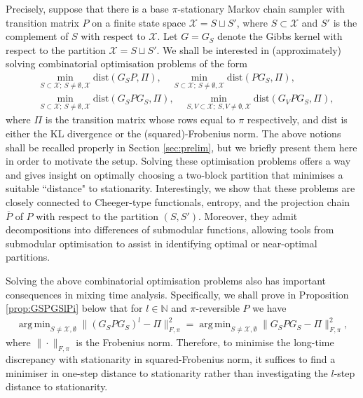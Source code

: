 \documentclass[EJP]{ejpecp} %
\DeclareMathOperator*{\argmin}{arg\,min}
\begin{document}
Precisely, suppose that there is a base $\pi$-stationary Markov chain sampler with transition matrix $P$ on a finite state space $\mathcal{X} = S \sqcup S'$, where $S \subset \mathcal{X}$ and $S'$ is the complement of $S$ with respect to $\mathcal{X}$. Let $G = G_S$ denote the Gibbs kernel with respect to the partition $\mathcal{X} = S \sqcup S'$. We shall be interested in (approximately) solving combinatorial optimisation problems of the form
\begin{align*}
    &\min_{S \subset \mathcal{X};~ S \neq \emptyset, \mathcal{X}} \mathrm{dist}(G_SP, \Pi), \quad \min_{S \subset \mathcal{X};~ S \neq \emptyset, \mathcal{X}} \mathrm{dist}(P G_S, \Pi), \\
    &\min_{S \subset \mathcal{X};~ S \neq \emptyset, \mathcal{X}} \mathrm{dist}(G_SPG_S, \Pi), \quad \min_{S,V \subset \mathcal{X};~ S,V \neq \emptyset, \mathcal{X}} \mathrm{dist}(G_VPG_S, \Pi),
\end{align*}
where $\Pi$ is the transition matrix whose rows equal to $\pi$ respectively, and $\mathrm{dist}$ is either the KL divergence or the (squared)-Frobenius norm. The above notions shall be recalled properly in Section \ref{sec:prelim}, but we briefly present them here in order to motivate the setup. Solving these optimisation problems offers a way and gives insight on optimally choosing a two-block partition that minimises a suitable ``distance" to stationarity. Interestingly, we show that these problems are closely connected to Cheeger-type functionals, entropy, and the projection chain $\overline{P}$ of $P$ with respect to the partition $(S,S')$. Moreover, they admit decompositions into differences of submodular functions, allowing tools from submodular optimisation to assist in identifying optimal or near-optimal partitions.

Solving the above combinatorial optimisation problems also has important consequences in mixing time analysis. Specifically, we shall prove in Proposition \ref{prop:GSPGSlPi} below that for $l \in \mathbb{N}$ and $\pi$-reversible $P$ we have
\begin{align*}
    \argmin_{S \neq \mathcal{X}, \emptyset} \|(G_SPG_S)^l - \Pi\|_{F, \pi}^2 = \argmin_{S \neq \mathcal{X}, \emptyset} \|G_SPG_S - \Pi\|_{F, \pi}^2,
\end{align*}
where $\|\cdot\|_{F, \pi}$ is the Frobenius norm. Therefore, to minimise the long-time discrepancy with stationarity in squared-Frobenius norm, it suffices to find a minimiser in one-step distance to stationarity rather than investigating the $l$-step distance to stationarity. 
\end{document}
